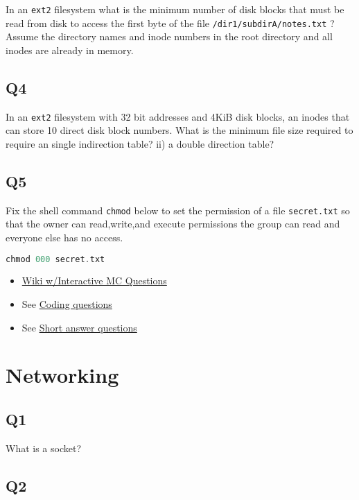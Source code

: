 In an \texttt{ext2} filesystem what is the minimum number of disk blocks that must be read from disk to access the first byte of the file \texttt{/dir1/subdirA/notes.txt} ? Assume the directory names and inode numbers in the root directory and all inodes are already in memory.

\subsection{Q4}\label{q4-3}

In an \texttt{ext2} filesystem with 32 bit addresses and 4KiB disk blocks, an inodes that can store 10 direct disk block numbers. What is the minimum file size required to require an single indirection table? ii) a double direction table?

\subsection{Q5}\label{q5-2}

Fix the shell command \texttt{chmod} below to set the permission of a file \texttt{secret.txt} so that the owner can read,write,and execute permissions the group can read and everyone else has no access.

\begin{lstlisting}[language=C]
chmod 000 secret.txt
\end{lstlisting}

\begin{itemize}
\tightlist
\item
  \href{http://angrave.github.io/SystemProgramming/networkingreviewquestions.html}{Wiki w/Interactive MC Questions}
\item
  See \protect\hyperlink{coding-questions}{Coding questions}
\item
  See \protect\hyperlink{short-answer-questions}{Short answer questions}
\end{itemize}

\section{Networking}

\subsection{Q1}\label{q1-5}

What is a socket?

\subsection{Q2}\label{q2-5}

